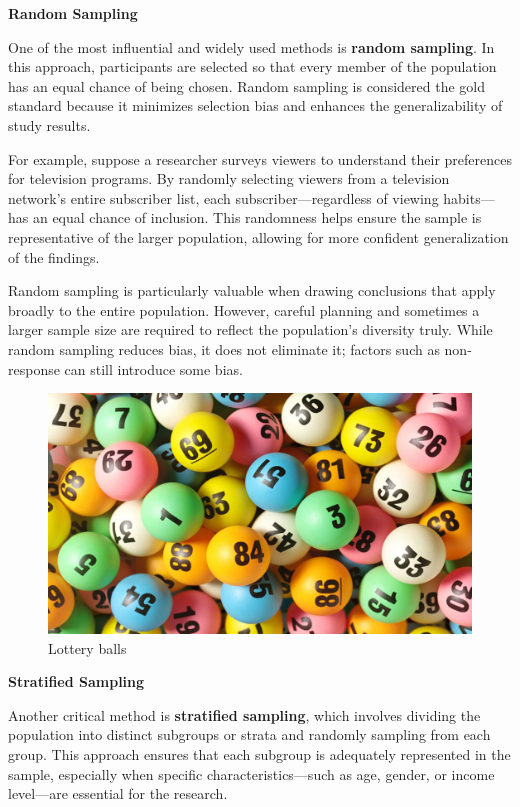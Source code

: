 \documentclass[
]{book}
\begin{document}
\textbf{Random Sampling}

One of the most influential and widely used methods is \textbf{random sampling}. In this approach, participants are selected so that every member of the population has an equal chance of being chosen. Random sampling is considered the gold standard because it minimizes selection bias and enhances the generalizability of study results.

For example, suppose a researcher surveys viewers to understand their preferences for television programs. By randomly selecting viewers from a television network's entire subscriber list, each subscriber---regardless of viewing habits---has an equal chance of inclusion. This randomness helps ensure the sample is representative of the larger population, allowing for more confident generalization of the findings.

Random sampling is particularly valuable when drawing conclusions that apply broadly to the entire population. However, careful planning and sometimes a larger sample size are required to reflect the population's diversity truly. While random sampling reduces bias, it does not eliminate it; factors such as non-response can still introduce some bias.

\begin{figure}
\centering
\includegraphics[width=1\linewidth,height=\textheight,keepaspectratio]{images/random.jpg}
\caption{Lottery balls}
\end{figure}

\textbf{Stratified Sampling}

Another critical method is \textbf{stratified sampling}, which involves dividing the population into distinct subgroups or strata and randomly sampling from each group. This approach ensures that each subgroup is adequately represented in the sample, especially when specific characteristics---such as age, gender, or income level---are essential for the research.
\end{document}

